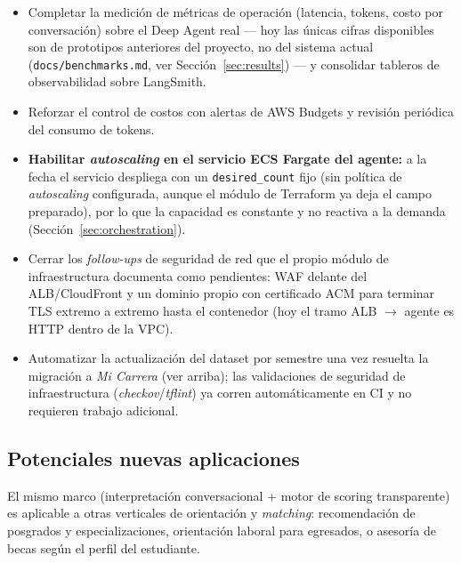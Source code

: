 \begin{itemize}[noitemsep]
  \item Completar la medici\'on de m\'etricas de operaci\'on (latencia, tokens,
        costo por conversaci\'on) sobre el Deep Agent real --- hoy las \'unicas
        cifras disponibles son de prototipos anteriores del proyecto, no del
        sistema actual (\texttt{docs/benchmarks.md}, ver
        Secci\'on~\ref{sec:results}) --- y consolidar tableros de
        observabilidad sobre LangSmith.
  \item Reforzar el control de costos con alertas de AWS Budgets y revisi\'on
        peri\'odica del consumo de tokens.
  \item \textbf{Habilitar \emph{autoscaling} en el servicio ECS Fargate del
        agente:} a la fecha el servicio despliega con un
        \texttt{desired\_count} fijo (sin pol\'itica de \emph{autoscaling}
        configurada, aunque el m\'odulo de Terraform ya deja el campo
        preparado), por lo que la capacidad es constante y no reactiva a la
        demanda (Secci\'on~\ref{sec:orchestration}).
  \item Cerrar los \emph{follow-ups} de seguridad de red que el propio
        m\'odulo de infraestructura documenta como pendientes: WAF delante del
        ALB/CloudFront y un dominio propio con certificado ACM para terminar
        TLS extremo a extremo hasta el contenedor (hoy el tramo ALB
        $\rightarrow$ agente es HTTP dentro de la VPC).
  \item Automatizar la actualizaci\'on del dataset por semestre una vez resuelta
        la migraci\'on a \emph{Mi Carrera} (ver arriba); las validaciones de
        seguridad de infraestructura (\emph{checkov}/\emph{tflint}) ya corren
        autom\'aticamente en CI y no requieren trabajo adicional.
\end{itemize}

\subsection{Potenciales nuevas aplicaciones}

El mismo marco (interpretaci\'on conversacional + motor de scoring transparente)
es aplicable a otras verticales de orientaci\'on y \emph{matching}: recomendaci\'on
de posgrados y especializaciones, orientaci\'on laboral para egresados, o
asesor\'ia de becas seg\'un el perfil del estudiante.
